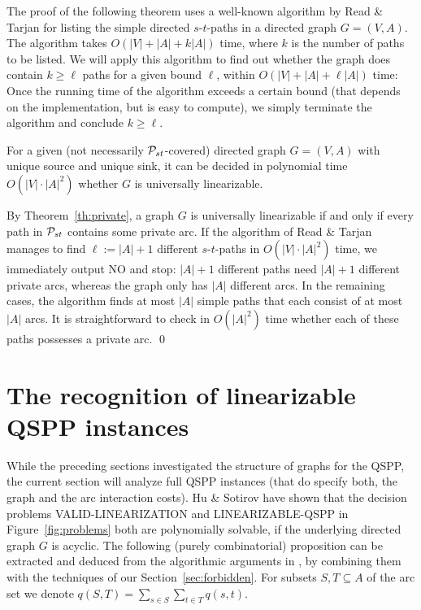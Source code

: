 \documentclass[11pt,fleqn]{article}
\begin{document}
\bigskip
The proof of the following theorem uses a well-known algorithm by Read \& Tarjan \cite{ReTa1975} 
for listing the simple directed $s$-$t$-paths in a directed graph $G=(V,A)$.
The algorithm takes $O(|V|+|A|+k|A|)$ time, where $k$ is the number of paths to be listed.
We will apply this algorithm to find out whether the graph does contain $k\ge\ell$ paths for
a given bound $\ell$, within $O(|V|+|A|+\ell|A|)$ time:
Once the running time of the algorithm exceeds a certain bound (that depends on the implementation,
but is easy to compute), we simply terminate the algorithm and conclude $k\ge\ell$.
\begin{theorem}
\label{th:algo}
For a given (not necessarily ${\cal P}_{st}$-covered) directed graph $G=(V,A)$ with unique source and 
unique sink, it can be decided in polynomial time $O(|V|\cdot|A|^2)$ 
whether $G$ is universally linearizable.
\end{theorem}
\proof
By Theorem~\ref{th:private}, a graph $G$ is universally linearizable if and only if 
every path in ${\cal P}_{st}$ contains some private arc.
If the algorithm of Read \& Tarjan \cite{ReTa1975} manages to find $\ell:=|A|+1$ different 
$s$-$t$-paths in $O(|V|\cdot|A|^2)$ time, we immediately output NO and stop: $|A|+1$ different 
paths need $|A|+1$ different private arcs, whereas the graph only has $|A|$ different arcs.
In the remaining cases, the algorithm finds at most $|A|$ simple paths that each consist of at most $|A|$ arcs.
It is straightforward to check in $O(|A|^2)$ time whether each of these paths possesses 
a private arc.
\qed


\medskip
\section{The recognition of linearizable QSPP instances}
\label{sec:hardness}
While the preceding sections investigated the structure of graphs for the QSPP, 
the current section will analyze full QSPP instances (that do specify both, the 
graph and the arc interaction costs).
Hu \& Sotirov \cite{HuSo2018b} have shown that the decision problems VALID-LI\-NEARI\-ZA\-TION
and LI\-NEA\-RIZABLE-QSPP in Figure~\ref{fig:problems} both are polynomially solvable, 
if the underlying directed graph $G$ is acyclic.
The following (purely combinatorial) proposition can be extracted and deduced from the algorithmic
arguments in \cite{HuSo2018b}, by combining them with the techniques of our Section~\ref{sec:forbidden}.
For subsets $S,T\subseteq A$ of the arc set we denote $q(S,T)=\sum_{s\in S}\sum_{t\in T}q(s,t)$.
\end{document}

